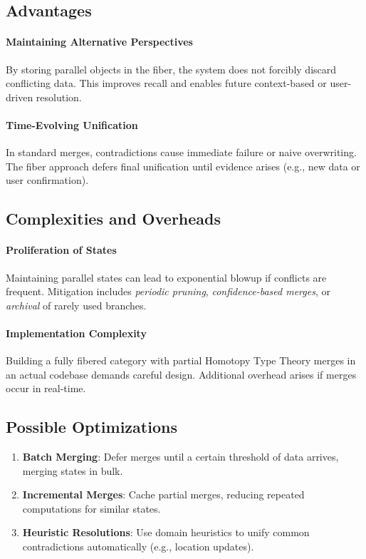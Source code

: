 \documentclass{article}
\begin{document}
\subsection{Advantages}
\paragraph{Maintaining Alternative Perspectives}  
By storing parallel objects in the fiber, the system does not forcibly discard conflicting data. This improves recall and enables future context-based or user-driven resolution.

\paragraph{Time-Evolving Unification}  
In standard merges, contradictions cause immediate failure or naive overwriting. The fiber approach defers final unification until evidence arises (e.g., new data or user confirmation).

\subsection{Complexities and Overheads}
\paragraph{Proliferation of States}  
Maintaining parallel states can lead to exponential blowup if conflicts are frequent. Mitigation includes \emph{periodic pruning}, \emph{confidence-based merges}, or \emph{archival} of rarely used branches.

\paragraph{Implementation Complexity}  
Building a fully fibered category with partial Homotopy Type Theory merges in an actual codebase demands careful design. Additional overhead arises if merges occur in real-time.

\subsection{Possible Optimizations}
\begin{enumerate}
    \item \textbf{Batch Merging}: Defer merges until a certain threshold of data arrives, merging states in bulk.  
    \item \textbf{Incremental Merges}: Cache partial merges, reducing repeated computations for similar states.  
    \item \textbf{Heuristic Resolutions}: Use domain heuristics to unify common contradictions automatically (e.g., location updates).
\end{enumerate}
\end{document}
